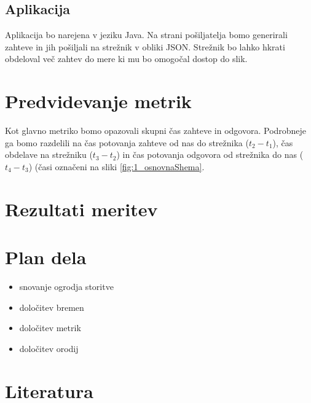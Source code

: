\subsection{Aplikacija}
Aplikacija bo narejena v jeziku Java. Na strani pošiljatelja bomo generirali zahteve in jih pošiljali na strežnik v obliki JSON. Strežnik bo lahko hkrati obdeloval več zahtev do mere ki mu bo omogočal dostop do slik.


\section{Predvidevanje metrik}
Kot glavno metriko bomo opazovali skupni čas zahteve in odgovora. Podrobneje ga bomo razdelili na čas potovanja zahteve od nas do strežnika ($t_2 - t_1$), čas obdelave na strežniku ($t_3 - t_2$) in čas potovanja odgovora od strežnika do nas ($t_4 - t_3$) (časi označeni na sliki \ref{fig:1_osnovnaShema}.

\section{Rezultati meritev}

\section{Plan dela}
\begin{itemize}
\item snovanje ogrodja storitve
\item določitev bremen
\item določitev metrik
\item določitev orodij
\end{itemize}

\section{Literatura}

